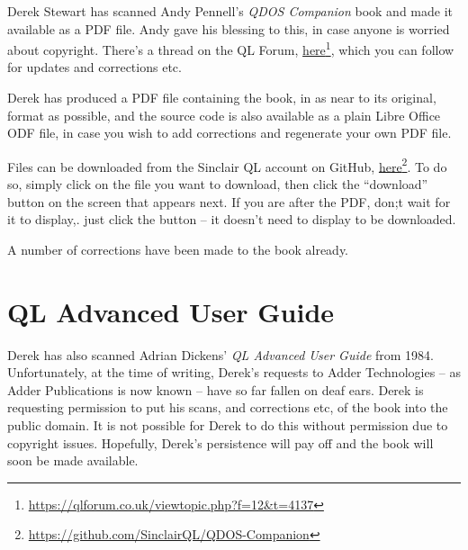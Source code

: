 Derek Stewart has scanned Andy Pennell's \emph{QDOS Companion} book
and made it available as a PDF file. Andy gave his blessing to this,
in case anyone is worried about copyright. There's a thread on the
QL Forum, \href{https://qlforum.co.uk/viewtopic.php?f=12&t=4137}{here}\footnote{\url{https://qlforum.co.uk/viewtopic.php?f=12\&t=4137}},
which you can follow for updates and corrections etc.

Derek has produced a PDF file containing the book, in as near to its
original, format as possible, and the source code is also available
as a plain Libre Office ODF file, in case you wish to add corrections
and regenerate your own PDF file.

Files can be downloaded from the Sinclair QL account on GitHub, \href{https://github.com/SinclairQL/QDOS-Companion}{here}\footnote{\url{https://github.com/SinclairQL/QDOS-Companion}}.
To do so, simply click on the file you want to download, then click
the ``download'' button on the screen that appears next. If you
are after the PDF, don;t wait for it to display,. just click the button
-- it doesn't need to display to be downloaded.

A number of corrections have been made to the book already.

\section{QL Advanced User Guide}

Derek has also scanned Adrian Dickens' \emph{QL Advanced User Guide}
from 1984. Unfortunately, at the time of writing, Derek's requests
to Adder Technologies -- as Adder Publications is now known -- have
so far fallen on deaf ears. Derek is requesting permission to put
his scans, and corrections etc, of the book into the public domain.
It is not possible for Derek to do this without permission due to
copyright issues. Hopefully, Derek's persistence will pay off and
the book will soon be made available.
